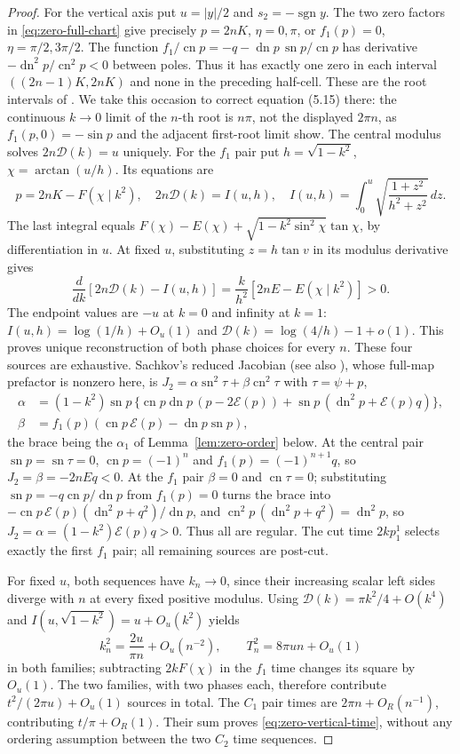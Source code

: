 \documentclass[11pt,a4paper]{article}
\theoremstyle{remark}\newtheorem{remark}[theorem]{Remark}
\newcommand{\sn}{\operatorname{sn}}
\newcommand{\cn}{\operatorname{cn}}
\newcommand{\dn}{\operatorname{dn}}
\begin{document}
\begin{proof}
For the vertical axis put $u=|y|/2$ and $s_2=-\operatorname{sgn}y$.
The two zero factors in \eqref{eq:zero-full-chart} give precisely
$p=2nK$, $\eta=0,\pi$, or $f_1(p)=0$, $\eta=\pi/2,3\pi/2$.
The function $f_1/\cn p=-q-\dn p\,\sn p/\cn p$ has derivative
$-\dn^2p/\cn^2p<0$ between poles. Thus it has exactly one zero in
each interval $((2n-1)K,2nK)$ and none in the preceding half-cell.
These are the root intervals of \cite[Lemma 5.3]{MS}. We take this
occasion to correct equation (5.15) there: the continuous $k\to0$ limit
of the $n$-th root is $n\pi$, not the displayed $2\pi n$, as
$f_1(p,0)=-\sin p$ and the adjacent first-root limit show.
The central modulus solves $2n\mathcal D(k)=u$ uniquely.
For the $f_1$ pair put $h=\sqrt{1-k^2}$, $\chi=\arctan(u/h)$.
Its equations are
\[
 p=2nK-F(\chi\mid k^2),\quad
 2n\mathcal D(k)=I(u,h),\quad
 I(u,h)=\int_0^u\sqrt{\frac{1+z^2}{h^2+z^2}}\,dz .
\]
The last integral equals
$F(\chi)-E(\chi)+\sqrt{1-k^2\sin^2\chi}\tan\chi$, by differentiation
in $u$. At fixed $u$, substituting $z=h\tan v$ in its modulus derivative
gives
\[
 \frac{d}{dk}[2n\mathcal D(k)-I(u,h)]
  =\frac{k}{h^2}[2nE-E(\chi\mid k^2)]>0.
\]
The endpoint values are $-u$ at $k=0$ and infinity at $k=1$:
$I(u,h)=\log(1/h)+O_u(1)$ and
$\mathcal D(k)=\log(4/h)-1+o(1)$. This proves unique reconstruction
of both phase choices for every $n$. These four sources are exhaustive.
Sachkov's reduced Jacobian \cite[(2.10)--(2.14)]{SC} (see also
\cite{CT}), whose full-map prefactor is nonzero here, is
$J_2=\alpha\sn^2\tau+\beta\cn^2\tau$ with $\tau=\psi+p$,
\begin{align*}
 \alpha&=(1-k^2)\sn p\,\{\cn p\dn p\,(p-2\mathcal E(p))
        +\sn p\,(\dn^2p+\mathcal E(p)q)\},\\
 \beta&=f_1(p)(\cn p\,\mathcal E(p)-\dn p\sn p),
\end{align*}
the brace being the $\alpha_1$ of Lemma~\ref{lem:zero-order} below.
At the central pair $\sn p=\sn\tau=0$, $\cn p=(-1)^n$ and
$f_1(p)=(-1)^{n+1}q$, so $J_2=\beta=-2nEq<0$. At the $f_1$ pair
$\beta=0$ and $\cn\tau=0$; substituting $\sn p=-q\cn p/\dn p$ from
$f_1(p)=0$ turns the brace into
$-\cn p\,\mathcal E(p)(\dn^2p+q^2)/\dn p$, and
$\cn^2p\,(\dn^2p+q^2)=\dn^2p$, so $J_2=\alpha=(1-k^2)\mathcal E(p)q>0$.
Thus all are regular. The cut time $2kp_1^1$ \cite[(2.2)]{SS}
selects exactly the first $f_1$ pair; all remaining sources are post-cut.

For fixed $u$, both sequences have $k_n\to0$, since their increasing
scalar left sides diverge with $n$ at every fixed positive modulus.
Using $\mathcal D(k)=\pi k^2/4+O(k^4)$ and
$I(u,\sqrt{1-k^2})=u+O_u(k^2)$ yields
\[
 k_n^2=\frac{2u}{\pi n}+O_u(n^{-2}),\qquad
 T_n^2=8\pi u n+O_u(1)
\]
in both families; subtracting $2kF(\chi)$ in the $f_1$ time changes
its square by $O_u(1)$. The two families, with two phases each, therefore contribute
$t^2/(2\pi u)+O_u(1)$ sources in total. The $C_1$ pair times are
$2\pi n+O_R(n^{-1})$, contributing $t/\pi+O_R(1)$. Their sum proves
\eqref{eq:zero-vertical-time}, without any ordering assumption between
the two $C_2$ time sequences.
\end{proof}
\end{document}
